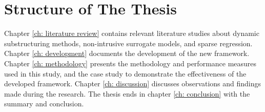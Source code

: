 %
%

\section{Structure of The Thesis}
\label{sec: structure}

Chapter \ref{ch: literature review} contains relevant literature studies about dynamic substructuring methods, non-intrusive surrogate models, and sparse regression.
Chapter \ref{ch: development} documents the development of the new framework.
Chapter \ref{ch: methodology} presents the methodology and performance measures used in this study, and the case study to demonstrate the effectiveness of the developed framework.
Chapter \ref{ch: discussion} discusses observations and findings made during the research.
The thesis ends in chapter \ref{ch: conclusion} with the summary and conclusion.